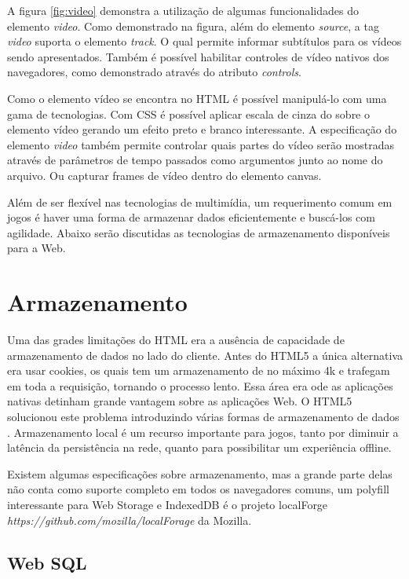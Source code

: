 A figura \ref{fig:video} demonstra a utilização de algumas
funcionalidades do elemento \textit{video}. Como demonstrado na figura,
além do elemento \textit{source}, a tag \textit{video} suporta o
elemento \textit{track}. O qual permite informar subtítulos para os
vídeos sendo apresentados. Também é possível habilitar controles de
vídeo nativos dos navegadores, como demonstrado através do atributo
\textit{controls}.

Como o elemento vídeo se encontra no HTML é possível manipulá-lo com
uma gama de tecnologias. Com CSS é possível aplicar escala de cinza do
sobre o elemento vídeo gerando um efeito preto e branco interessante.
A especificação do elemento \textit{video} também permite controlar
quais partes do vídeo serão mostradas através de parâmetros de tempo
passados como argumentos junto ao nome do arquivo. Ou capturar 
frames de vídeo dentro do elemento canvas.

Além de ser flexível nas tecnologias de multimídia, um
requerimento comum em jogos é haver uma forma de armazenar dados
eficientemente e buscá-los com agilidade. Abaixo serão discutidas as
tecnologias de armazenamento disponíveis para a Web.
\section{Armazenamento}
Uma das grades limitações do HTML era a ausência de capacidade de
armazenamento de dados no lado do cliente. Antes do HTML5 a única
alternativa era usar cookies, os quais tem um armazenamento de no
máximo 4k e trafegam em toda a requisição, tornando o processo lento.
Essa área era ode as aplicações nativas detinham grande vantagem
sobre as aplicações Web. O HTML5 solucionou este problema introduzindo
várias formas de armazenamento de dados \autocite{html5Tradeoffs}.
Armazenamento local é um recurso importante para jogos, tanto por
diminuir a latência da persistência na rede, quanto para possibilitar
um experiência offline.

Existem algumas especificações sobre armazenamento, mas a grande
parte delas não conta como suporte completo em todos os navegadores
comuns, um polyfill interessante para Web Storage  e IndexedDB é o
projeto localForge \textit{https://github.com/mozilla/localForage} da
Mozilla.

\subsection{Web SQL}

